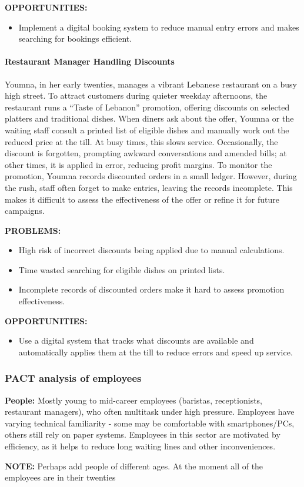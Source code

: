 \documentclass[]{VUMIFTemplateClass}
\newcommand{\noticecomment}[1]{%
    \begin{tcolorbox}[colback=blue!20, colframe=blue!60, arc=0pt, outer arc=0pt, boxrule=1pt, left=3pt, right=3pt, top=3pt, bottom=3pt]
        \textbf{\textcolor{blue!70!black}{NOTE:}} #1
    \end{tcolorbox}
}
\newcommand{\todocomment}[1]{%
    \begin{tcolorbox}[colback=red!20, colframe=red!60, arc=0pt, outer arc=0pt, boxrule=1pt, left=3pt, right=3pt, top=3pt, bottom=3pt]
        \textbf{\textcolor{orange!70!black}{TODO:}} #1
    \end{tcolorbox}
}
\newcommand{\subsubsubsection}[1]{\paragraph{#1}}
\begin{document}
\textbf{OPPORTUNITIES:}
\begin{itemize}
    \item Implement a digital booking system to reduce manual entry errors and
    makes searching for bookings efficient.
\end{itemize}


\subsubsubsection{Restaurant Manager Handling Discounts}


Youmna, in her early twenties, manages a vibrant Lebanese restaurant on a busy
high street. To attract customers during quieter weekday afternoons, the
restaurant runs a “Taste of Lebanon” promotion, offering discounts on selected
platters and traditional dishes. When diners ask about the offer, Youmna or the
waiting staff consult a printed list of eligible dishes and manually work out
the reduced price at the till. At busy times, this slows service. Occasionally,
the discount is forgotten, prompting awkward conversations and amended bills; at
other times, it is applied in error, reducing profit margins. To monitor the
promotion, Youmna records discounted orders in a small ledger. However, during
the rush, staff often forget to make entries, leaving the records incomplete.
This makes it difficult to assess the effectiveness of the offer or refine it
for future campaigns.

\textbf{PROBLEMS:}

\begin{itemize}
    \item High risk of incorrect discounts being applied due to manual calculations.
    \item Time wasted searching for eligible dishes on printed lists.
    \item Incomplete records of discounted orders make it hard to assess promotion effectiveness.
\end{itemize}
\textbf{OPPORTUNITIES:}
\begin{itemize}
    \item Use a digital system that tracks what discounts are available and
    automatically applies them at the till to reduce errors and speed up service.
\end{itemize}

\subsubsection{PACT analysis of employees}
    \textbf{People:} Mostly young to mid-career employees (baristas,
    receptionists, restaurant managers), who often multitask under high
    pressure. Employees have varying technical familiarity - some may be
    comfortable with smartphones/PCs, others still rely on paper systems.
    Employees in this sector are motivated by efficiency, as it helps to reduce long waiting lines and other inconveniences.  
    \noticecomment{Perhaps add people of different ages. At the moment all of the employees are in their twenties}
    
\end{document}
